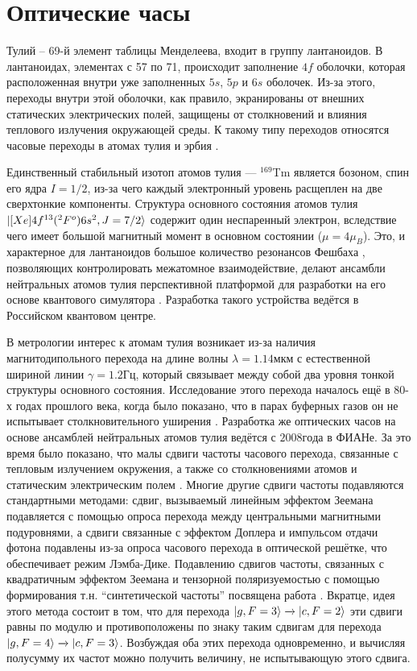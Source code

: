 \chapter{Оптические часы}\label{ch:ch0}

Тулий -- 69-й элемент таблицы Менделеева, входит в группу лантаноидов.
В лантаноидах, элементах с 57 по 71, происходит заполнение $4f$ оболочки, которая расположенная внутри уже заполненных $5s$, $5p$ и $6s$ оболочек. 
Из-за этого, переходы внутри этой оболочки, как правило, экранированы от внешних статических электрических полей, защищены от столкновений и влияния теплового излучения окружающей среды.
К такому типу переходов относятся часовые переходы в атомах тулия и эрбия \cite{patscheider2021observation}.

Единственный стабильный изотоп атомов тулия --- $^{169}$Tm является бозоном, спин его ядра $I = 1/2$, из-за чего каждый электронный уровень расщеплен на две сверхтонкие компоненты.
Структура основного состояния атомов тулия $\ket{[Xe]4f^{13}(^2 F^o)6s^2, J = 7/2}$ содержит один неспаренный электрон, вследствие чего имеет большой магнитный момент в основном состоянии ($\mu = 4 \mu_B$).
Это, и характерное для лантаноидов большое количество резонансов Фешбаха \cite{kotochigova2014controlling}, позволяющих контролировать межатомное взаимодействие, делают ансамбли нейтральных атомов тулия перспективной платформой для разработки на его основе квантового симулятора \cite{davletov2020machine}.
Разработка такого устройства ведётся в Российском квантовом центре.

В метрологии интерес к атомам тулия возникает из-за наличия магнитодипольного перехода на длине волны $\lambda = 1.14\unit{мкм}$ с естественной шириной линии $\gamma = 1.2\unit{Гц}$, который связывает между собой два уровня тонкой структуры основного состояния. 
Исследование этого перехода началось ещё в 80-х годах прошлого века, когда было показано, что в парах буферных газов он не испытывает столкновительного уширения \cite{александров1983неуширяемая}. 
Разработка же оптических часов на основе ансамблей нейтральных атомов тулия ведётся с $2008 \unit{года}$ в ФИАНе.
За это время было показано, что малы сдвиги частоты часового перехода, связанные с тепловым излучением окружения, а также со столкновениями атомов и статическим электрическим полем \cite{golovizin2019inner}.
Многие другие сдвиги частоты подавляются стандартными методами: сдвиг, вызываемый линейным эффектом Зеемана подавляется с помощью опроса перехода между центральными магнитными подуровнями, а сдвиги связанные с эффектом Доплера и импульсом отдачи фотона подавлены из-за опроса часового перехода в оптической решётке, что обеспечивает режим Лэмба-Дике.
Подавлению сдвигов частоты, связанных с квадратичным эффектом Зеемана и тензорной поляризуемостью с помощью формирования т.н. ``синтетической частоты'' посвящена работа \cite{golovizin2021simultaneous}.
Вкратце, идея этого метода состоит в том, что для перехода $\ket{g, F = 3} \xrightarrow{} \ket{c, F = 2}$ эти сдвиги равны по модулю и противоположены по знаку таким сдвигам для перехода $\ket{g, F = 4} \xrightarrow{} \ket{c, F = 3}$. 
Возбуждая оба этих перехода одновременно, и вычисляя полусумму их частот можно получить величину, не испытывающую этого сдвига. 


